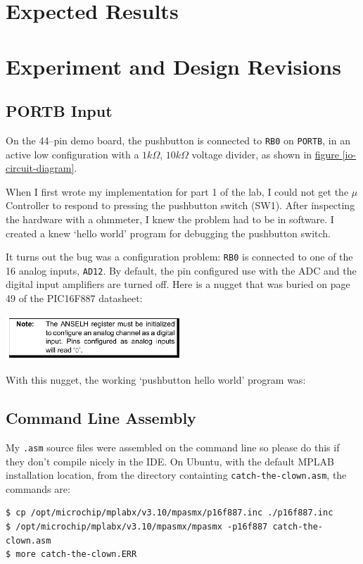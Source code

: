 \documentclass[11pt]{article}
\begin{document}
\section{Expected Results}

\section{Experiment and Design Revisions}

\pagebreak
\subsection{PORTB Input}

On the 44--pin demo board, the pushbutton is connected to \texttt{RB0}
on \texttt{PORTB}, in an active low configuration with a $1k\Omega$, $10k\Omega$
voltage divider, as shown in \hyperref[io-circuit-diagram]{figure \ref{io-circuit-diagram}}.

When I first wrote my implementation for part 1 of the lab,
I could not get the $\mu$Controller to respond to pressing the
pushbutton switch (SW1). After inspecting the hardware with a ohmmeter,
I knew the problem had to be in software. I created a knew `hello world'
program for debugging the pushbutton switch.

It turns out the bug was a configuration problem: \texttt{RB0} is connected
to one of the 16 analog inputs, \texttt{AD12}. By default, the pin configured
use with the ADC and the digital input amplifiers are turned off.
Here is a nugget that was buried on page 49 of the PIC16F887 datasheet:
\begin{center}
	\includegraphics[width=0.5\textwidth]{Figures/port-b-configuration-note.pdf}
\end{center}
With this nugget, the working `pushbutton hello world' program was:


\pagebreak
\subsection{Command Line Assembly}

My \texttt{.asm} source files were assembled on the command line so
please do this if they don't compile nicely in the IDE.
On Ubuntu, with the default MPLAB installation location, 
from the directory containting \texttt{catch-the-clown.asm}, the commands are:
\begin{verbatim}
$ cp /opt/microchip/mplabx/v3.10/mpasmx/p16f887.inc ./p16f887.inc
$ /opt/microchip/mplabx/v3.10/mpasmx/mpasmx -p16f887 catch-the-clown.asm
$ more catch-the-clown.ERR
\end{verbatim}
\end{document}
